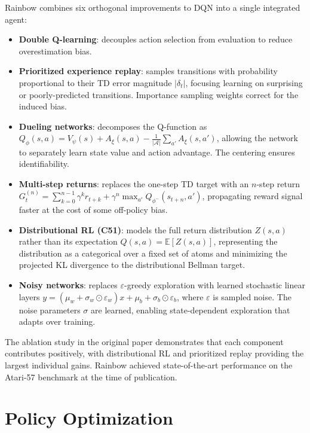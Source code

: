 \documentclass[11pt, letterpaper]{article}
\begin{document}
\begin{concept}
    Rainbow combines six orthogonal improvements to DQN into a single integrated agent:
    \begin{itemize}
        \item \textbf{Double Q-learning}: decouples action selection from evaluation to reduce overestimation bias.
        \item \textbf{Prioritized experience replay}: samples transitions with probability proportional to their TD error magnitude \(|\delta_t|\), focusing learning on surprising or poorly-predicted transitions. Importance sampling weights correct for the induced bias.
        \item \textbf{Dueling networks}: decomposes the Q-function as \(Q_\phi(s, a) = V_\psi(s) + A_\xi(s, a) - \frac{1}{|\mathcal{A}|}\sum_{a'} A_\xi(s, a')\), allowing the network to separately learn state value and action advantage. The centering ensures identifiability.
        \item \textbf{Multi-step returns}: replaces the one-step TD target with an \(n\)-step return \(G_t^{(n)} = \sum_{k=0}^{n-1} \gamma^k r_{t+k} + \gamma^n \max_{a'} Q_{\phi^-}(s_{t+n}, a')\), propagating reward signal faster at the cost of some off-policy bias.
        \item \textbf{Distributional RL (C51)}: models the full return distribution \(Z(s, a)\) rather than its expectation \(Q(s,a) = \mathbb{E}[Z(s,a)]\), representing the distribution as a categorical over a fixed set of atoms and minimizing the projected KL divergence to the distributional Bellman target.
        \item \textbf{Noisy networks}: replaces \(\varepsilon\)-greedy exploration with learned stochastic linear layers \(y = (\mu_w + \sigma_w \odot \varepsilon_w) x + \mu_b + \sigma_b \odot \varepsilon_b\), where \(\varepsilon\) is sampled noise. The noise parameters \(\sigma\) are learned, enabling state-dependent exploration that adapts over training.
    \end{itemize}
    The ablation study in the original paper demonstrates that each component contributes positively, with distributional RL and prioritized replay providing the largest individual gains. Rainbow achieved state-of-the-art performance on the Atari-57 benchmark at the time of publication.
\end{concept}

\newpage
\section{Policy Optimization}
\end{document}
